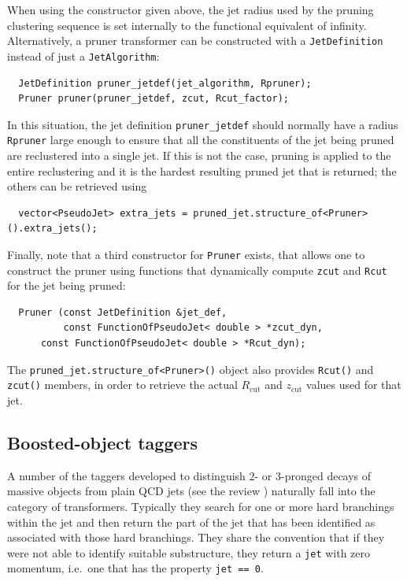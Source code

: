 \documentclass[12pt,a4]{article}
\newcommand{\ttt}[1]{{\small\texttt{#1}}}
\begin{document}
When using the constructor given above, the jet radius used by the pruning clustering 
sequence is set internally to the functional equivalent of infinity. Alternatively, 
a pruner transformer can be constructed with a \ttt{JetDefinition} instead of just a
\ttt{JetAlgorithm}:
\begin{lstlisting}
  JetDefinition pruner_jetdef(jet_algorithm, Rpruner);
  Pruner pruner(pruner_jetdef, zcut, Rcut_factor);
\end{lstlisting}
In this situation, the jet definition \ttt{pruner\_jetdef} should normally have a radius
\ttt{Rpruner}
large enough to ensure that
all the constituents of the jet being pruned are reclustered into a single jet. 
%
If this is not the case, pruning is applied to the entire reclustering
and it is the hardest resulting pruned jet that is returned; the
others can be retrieved using
\begin{lstlisting}
  vector<PseudoJet> extra_jets = pruned_jet.structure_of<Pruner>().extra_jets();
\end{lstlisting}

Finally, note that a third constructor for \ttt{Pruner} exists, that allows one
to construct the pruner using functions that dynamically compute \ttt{zcut} and
\ttt{Rcut} for the jet being pruned:
\begin{lstlisting}
  Pruner (const JetDefinition &jet_def, 
          const FunctionOfPseudoJet< double > *zcut_dyn, 
	  const FunctionOfPseudoJet< double > *Rcut_dyn);
\end{lstlisting}
The \ttt{pruned\_jet.structure\_of<Pruner>()} object also provides
\ttt{Rcut()} and \ttt{zcut()} members, in order to retrieve the
actual $R_\text{cut}$ and $z_\text{cut}$ values used for that jet.


\subsection{Boosted-object taggers}
\label{sec:taggers}

A number of the taggers developed to distinguish 2- or 3-pronged
decays of massive objects from plain QCD jets (see the review
\cite{Abdesselam:2010pt}) naturally fall into the category of
transformers.
%
Typically they search for one or more hard branchings within the jet
and then return the part of the jet that has been identified as
associated with those hard branchings.
%
They share the convention that if they were not able to identify
suitable substructure, they return a \ttt{jet} with zero momentum,
i.e.\ one that has the property \ttt{jet == 0}.
\end{document}
